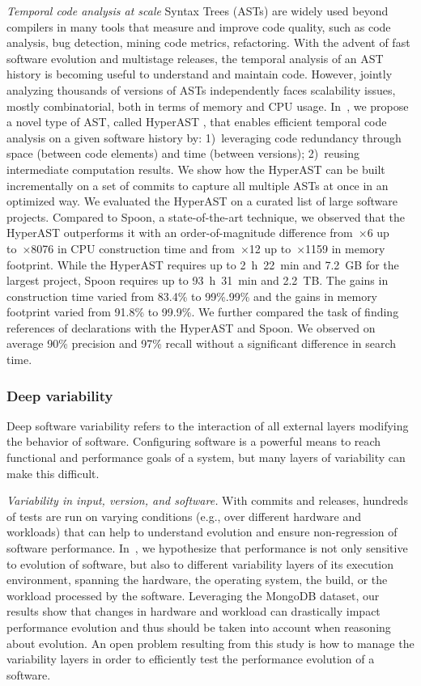  \emph{Temporal code analysis at scale} Syntax Trees (ASTs) are widely used beyond compilers in many tools that measure and improve code quality, such as code analysis, bug detection, mining code metrics, refactoring. With the advent of fast software evolution and multistage releases, the temporal analysis of an AST history is becoming useful to understand and maintain code. However, jointly analyzing thousands of versions of ASTs independently faces scalability issues, mostly combinatorial, both in terms of memory and CPU usage. In~\cite{ledilavrec:hal-03764541}, we propose a novel type of AST, called HyperAST , that enables efficient temporal code analysis on a given software history by: 1)~leveraging code redundancy through space (between code elements) and time (between versions); 2)~reusing intermediate computation results. We show how the HyperAST can be built incrementally on a set of commits to capture all multiple ASTs at once in an optimized way. We evaluated the HyperAST on a curated list of large software projects. Compared to Spoon, a state-of-the-art technique, we observed that the HyperAST outperforms it with an order-of-magnitude difference from~×6 up to~×8076 in CPU construction time and from~×12 up to~×1159 in memory footprint. While the HyperAST requires up to 2~h~22~min and 7.2~GB for the largest project, Spoon requires up to 93~h~31~min and 2.2~TB. The gains in construction time varied from 83.4\% to 99\%.99\% and the gains in memory footprint varied from 91.8\% to 99.9\%. We further compared the task of finding references of declarations with the HyperAST and Spoon. We observed on average 90\% precision and 97\% recall without a significant difference in search time. 
 
 \subsubsection{Deep variability}
 
 Deep software variability refers to the interaction of all external layers modifying the behavior of software. Configuring software is a powerful means to reach functional and performance goals of a system, but many layers of variability can make this difficult.
 
\emph{Variability in input, version, and software.} With commits and releases, hundreds of tests are run on varying conditions (e.g., over different hardware and workloads) that can help to understand evolution and ensure non-regression of software performance. In~\cite{lesoil:hal-03624309}, we hypothesize that performance is not only sensitive to evolution of software, but also to different variability layers of its execution environment, spanning the hardware, the operating system, the build, or the workload processed by the software. Leveraging the MongoDB dataset, our results show that changes in hardware and workload can drastically impact performance evolution and thus should be taken into account when reasoning about evolution. An open problem resulting from this study is how to manage the variability layers in order to efficiently test the performance evolution of a software.
 

